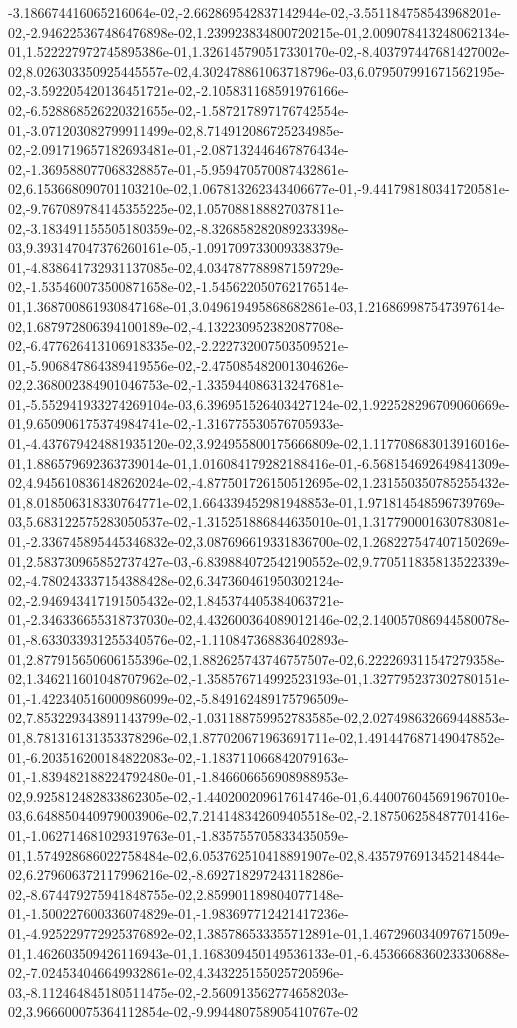 -3.186674416065216064e-02,-2.662869542837142944e-02,-3.551184758543968201e-02,-2.946225367486476898e-02,1.239923834800720215e-01,2.009078413248062134e-01,1.522227972745895386e-01,1.326145790517330170e-02,-8.403797447681427002e-02,8.026303350925445557e-02,4.302478861063718796e-03,6.079507991671562195e-02,-3.592205420136451721e-02,-2.105831168591976166e-02,-6.528868526220321655e-02,-1.587217897176742554e-01,-3.071203082799911499e-02,8.714912086725234985e-02,-2.091719657182693481e-01,-2.087132446467876434e-02,-1.369588077068328857e-01,-5.959470570087432861e-02,6.153668090701103210e-02,1.067813262343406677e-01,-9.441798180341720581e-02,-9.767089784145355225e-02,1.057088188827037811e-02,-3.183491155505180359e-02,-8.326858282089233398e-03,9.393147047376260161e-05,-1.091709733009338379e-01,-4.838641732931137085e-02,4.034787788987159729e-02,-1.535460073500871658e-02,-1.545622050762176514e-01,1.368700861930847168e-01,3.049619495868682861e-03,1.216869987547397614e-02,1.687972806394100189e-02,-4.132230952382087708e-02,-6.477626413106918335e-02,-2.222732007503509521e-01,-5.906847864389419556e-02,-2.475085482001304626e-02,2.368002384901046753e-02,-1.335944086313247681e-01,-5.552941933274269104e-03,6.396951526403427124e-02,1.922528296709060669e-01,9.650906175374984741e-02,-1.316775530576705933e-01,-4.437679424881935120e-02,3.924955800175666809e-02,1.117708683013916016e-01,1.886579692363739014e-01,1.016084179282188416e-01,-6.568154692649841309e-02,4.945610836148262024e-02,-4.877501726150512695e-02,1.231550350785255432e-01,8.018506318330764771e-02,1.664339452981948853e-01,1.971814548596739769e-03,5.683122575283050537e-02,-1.315251886844635010e-01,1.317790001630783081e-01,-2.336745895445346832e-02,3.087696619331836700e-02,1.268227547407150269e-01,2.583730965852737427e-03,-6.839884072542190552e-02,9.770511835813522339e-02,-4.780243337154388428e-02,6.347360461950302124e-02,-2.946943417191505432e-02,1.845374405384063721e-01,-2.346336655318737030e-02,4.432600364089012146e-02,2.140057086944580078e-01,-8.633033931255340576e-02,-1.110847368836402893e-01,2.877915650606155396e-02,1.882625743746757507e-02,6.222269311547279358e-02,1.346211601048707962e-02,-1.358576714992523193e-01,1.327795237302780151e-01,-1.422340516000986099e-02,-5.849162489175796509e-02,7.853229343891143799e-02,-1.031188759952783585e-02,2.027498632669448853e-01,8.781316131353378296e-02,1.877020671963691711e-02,1.491447687149047852e-01,-6.203516200184822083e-02,-1.183711066842079163e-01,-1.839482188224792480e-01,-1.846606656908988953e-02,9.925812482833862305e-02,-1.440200209617614746e-01,6.440076045691967010e-03,6.648850440979003906e-02,7.214148342609405518e-02,-2.187506258487701416e-01,-1.062714681029319763e-01,-1.835755705833435059e-01,1.574928686022758484e-02,6.053762510418891907e-02,8.435797691345214844e-02,6.279606372117996216e-02,-8.692718297243118286e-02,-8.674479275941848755e-02,2.859901189804077148e-01,-1.500227600336074829e-01,-1.983697712421417236e-01,-4.925229772925376892e-02,1.385786533355712891e-01,1.467296034097671509e-01,1.462603509426116943e-01,1.168309450149536133e-01,-6.453666836023330688e-02,-7.024534046649932861e-02,4.343225155025720596e-03,-8.112464845180511475e-02,-2.560913562774658203e-02,3.966600075364112854e-02,-9.994480758905410767e-02

